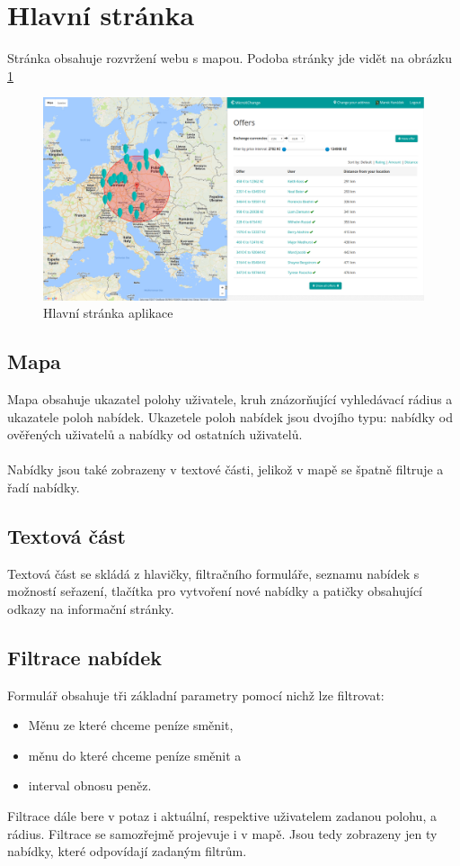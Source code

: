 \section{Hlavní stránka}

\label{nur:homepage}
Stránka obsahuje rozvržení webu s mapou. Podoba stránky jde vidět na obrázku \ref{fig:tur:homepage}

\begin{figure}[h]
    \centering
    \includegraphics[width=1.0\textwidth]{media/tur/homepage.png}
    \caption{Hlavní stránka aplikace}
    \label{fig:tur:homepage}
\end{figure}

\subsection{Mapa}
Mapa obsahuje ukazatel polohy uživatele, kruh znázorňující vyhledávací rádius a ukazatele poloh nabídek. Ukazetele poloh nabídek jsou dvojího typu: nabídky od ověřených uživatelů a nabídky od ostatních uživatelů.
\\\\
Nabídky jsou také zobrazeny v textové části, jelikož v mapě se špatně filtruje a řadí nabídky.

\subsection{Textová část}
Textová část se skládá z hlavičky, filtračního formuláře, seznamu nabídek s možností seřazení, tlačítka pro vytvoření nové nabídky a patičky obsahující odkazy na informační stránky.

\subsection{Filtrace nabídek}
Formulář obsahuje tři základní parametry pomocí nichž lze filtrovat:
\begin{itemize}
	\item Měnu ze které chceme peníze směnit,
	\item měnu do které chceme peníze směnit a
	\item interval obnosu peněz.
\end{itemize}
Filtrace dále bere v potaz i aktuální, respektive uživatelem zadanou polohu, a rádius. Filtrace se samozřejmě projevuje i v mapě. Jsou tedy zobrazeny jen ty nabídky, které odpovídají zadaným filtrům.

